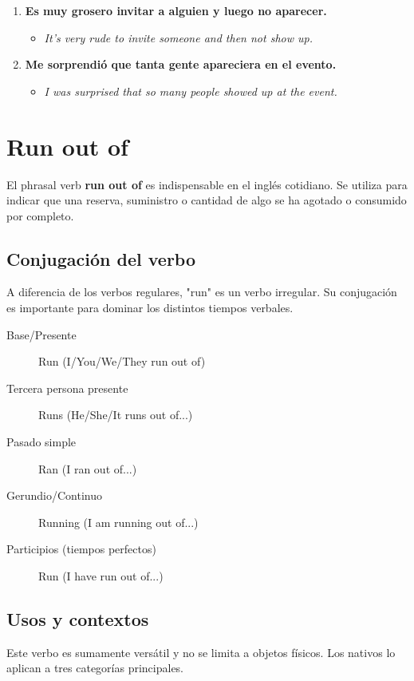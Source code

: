 \documentclass[
10pt, %
a4paper, %
oneside, %
headinclude,footinclude, %
BCOR5mm, %
]{scrartcl}
\begin{document}
\begin{enumerate}
\begin{itemize}
	\end{itemize}
	\item \textbf{Es muy grosero invitar a alguien y luego no aparecer.}
	\begin{itemize}
		\item \textit{It's very rude to invite someone and then not show up.}
	\end{itemize}
	\item \textbf{Me sorprendió que tanta gente apareciera en el evento.}
	\begin{itemize}
		\item \textit{I was surprised that so many people showed up at the event.}
	\end{itemize}
\end{enumerate}

\newpage

\section{Run out of}
El phrasal verb \textbf{run out of} es indispensable en el inglés cotidiano. Se utiliza para indicar que una reserva, suministro o cantidad de algo se ha agotado o consumido por completo.

\subsection{Conjugación del verbo}
A diferencia de los verbos regulares, "run" es un verbo irregular. Su conjugación es importante para dominar los distintos tiempos verbales.

\begin{description}
	\item[Base/Presente] Run (I/You/We/They run out of)
	\item[Tercera persona presente] Runs (He/She/It runs out of...)
	\item[Pasado simple] Ran (I ran out of...)
	\item[Gerundio/Continuo] Running (I am running out of...)
	\item[Participios (tiempos perfectos)] Run (I have run out of...)
\end{description}

\subsection{Usos y contextos}
Este verbo es sumamente versátil y no se limita a objetos físicos. Los nativos lo aplican a tres categorías principales.
\end{document}
